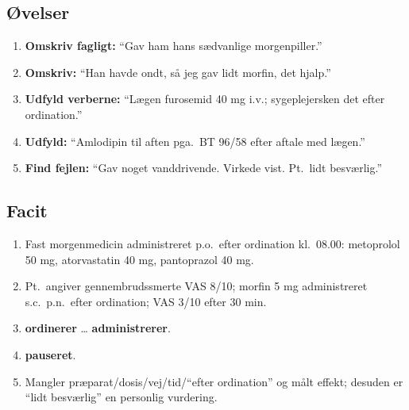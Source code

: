 \documentclass[11pt,a4paper]{report}
\begin{document}
\subsection{Øvelser}
\begin{enumerate}[leftmargin=1.5em,itemsep=8pt]
\item \textbf{Omskriv fagligt:} ``Gav ham hans sædvanlige morgenpiller.''
\item \textbf{Omskriv:} ``Han havde ondt, så jeg gav lidt morfin, det hjalp.''
\item \textbf{Udfyld verberne:} ``Lægen \underline{\hspace{2cm}} furosemid 40 mg i.v.; sygeplejersken \underline{\hspace{2.5cm}} det efter ordination.''
\item \textbf{Udfyld:} ``Amlodipin \underline{\hspace{2cm}} til aften pga.\ BT 96/58 efter aftale med lægen.''
\item \textbf{Find fejlen:} ``Gav noget vanddrivende. Virkede vist. Pt.\ lidt besværlig.''
\end{enumerate}

\subsection{Facit}
\begin{enumerate}[leftmargin=1.5em,itemsep=5pt]
\item Fast morgenmedicin administreret p.o.\ efter ordination kl.\ 08.00: metoprolol 50 mg, atorvastatin 40 mg, pantoprazol 40 mg.
\item Pt.\ angiver gennembrudssmerte VAS 8/10; morfin 5 mg administreret s.c.\ p.n.\ efter ordination; VAS 3/10 efter 30 min.
\item \textbf{ordinerer} \ldots{} \textbf{administrerer}.
\item \textbf{pauseret}.
\item Mangler præparat/dosis/vej/tid/``efter ordination'' og målt effekt; desuden er ``lidt besværlig'' en personlig vurdering.
\end{enumerate}

\vfill
{}
\end{document}
